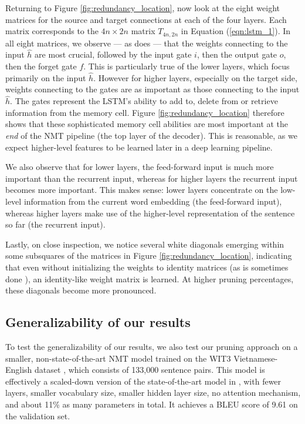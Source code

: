 Returning to Figure \ref{fig:redundancy_location}, now look at the eight weight matrices for the source and target connections at each of the four layers.
Each matrix corresponds to the $4n \times 2n$ matrix $T_{4n,2n}$ in Equation (\ref{eqn:lstm_1}).
In all eight matrices, we observe --- as does \cite{lu2016learning} --- that the weights connecting to the input $\hat{h}$ are most crucial, followed by the input gate $i$, then the output gate $o$, then the forget gate $f$. 
This is particularly true of the lower layers, which focus primarily on the input $\hat{h}$. 
However for higher layers, especially on the target side, weights connecting to the gates are as important as those connecting to the input $\hat{h}$.
The gates represent the LSTM's ability to add to, delete from or retrieve information from the memory cell.
Figure \ref{fig:redundancy_location} therefore shows that these sophisticated memory cell abilities are most important at the \emph{end} of the NMT pipeline (the top layer of the decoder).
This is reasonable, as we expect higher-level features to be learned later in a deep learning pipeline.

We also observe that for lower layers, the feed-forward input is much more important than the recurrent input, whereas for higher layers the recurrent input becomes more important.
This makes sense: lower layers concentrate on the low-level information from the current word embedding (the feed-forward input), whereas higher layers make use of the higher-level representation of the sentence so far (the recurrent input).

Lastly, on close inspection, we notice several white diagonals emerging within
some subsquares of the matrices in Figure \ref{fig:redundancy_location},
indicating that even without initializing the weights to identity matrices
(as is sometimes done \cite{le2015simple}),
an identity-like weight matrix is learned. At higher pruning percentages, these diagonals become more pronounced.

\subsection{Generalizability of our results}
To test the generalizability of our results, we also test our pruning approach
on a smaller, non-state-of-the-art NMT model trained on the WIT3 Vietnamese-English 
dataset \cite{cettoloEtAl:EAMT2012}, which consists of 133,000 sentence pairs.
This model is effectively a scaled-down version of the state-of-the-art model in \cite{luong15attn},
with fewer layers, smaller vocabulary size, smaller hidden layer size, no attention mechanism,
and about 11\% as many parameters in total.
It achieves a BLEU score of 9.61 on the validation set.

